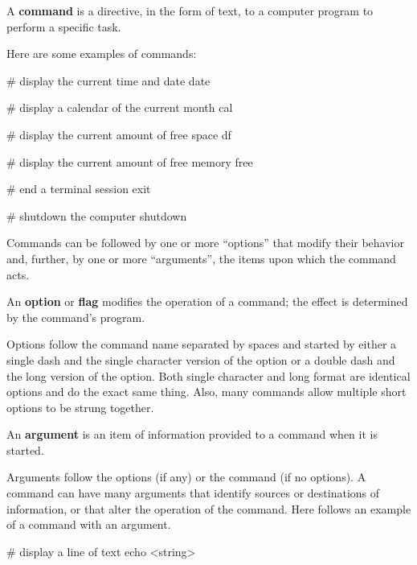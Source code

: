 \bd[Command]
A \textbf{command} is a directive, in the form of text, to a computer program to perform a specific task.
\ed

\be
Here are some examples of commands:
\begin{bash}
# display the current time and date
date
\end{bash}

\begin{bash}
# display a calendar of the current month
cal
\end{bash}

\begin{bash}
# display the current amount of free space
df
\end{bash}

\begin{bash}
# display the current amount of free memory
free
\end{bash}

\begin{bash}
# end a terminal session
exit
\end{bash}

\begin{bash}
# shutdown the computer
shutdown
\end{bash}
\ee

Commands can be followed by one or more ``options'' that modify their behavior and, further, by one or more
``arguments'', the items upon which the command acts.

An \textbf{option} or \textbf{flag} modifies the operation of a command; the effect is determined by the command's
program.
\ed

Options follow the command name separated by spaces and started by either a single dash \code{-} and the single
character version of the option or a double dash \code{--} and the long version of the option. Both single character
and long format are identical options and do the exact same thing. Also, many commands allow multiple short options to
be strung together.

\bd[Argument]
An \textbf{argument} is an item of information provided to a command when it is started.
\ed

Arguments follow the options (if any) or the command (if no options). A command can have many arguments that identify
sources or destinations of information, or that alter the operation of the command. Here follows an example of a command
with an argument.

\be
\begin{bash}
# display a line of text
echo <string>
\end{bash}
\ee

